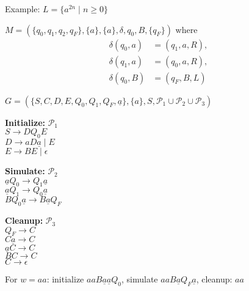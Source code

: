 \documentclass[handout]{beamer}
\begin{document}
\begin{frame}{Example: $L=\{a^{2n}\mid n\geq 0\}$}

    $M=(\{q_0,q_1,q_2,q_F\},\{a\},\{a\},\delta,q_0,B,\{q_F\})$ where 
    \begin{align*}
        \delta(q_0,a)&=( q_1,a,R),\\
        \delta(q_1,a)&=(q_0,a,R), \\
        \delta(q_0,B)&=(q_F,B,L)
    \end{align*}
        
    $G=(\{S,C,D,E,Q_0,Q_1,Q_F,\underline{a}\},\{a\},S,\mathcal P_1\cup\mathcal P_2\cup\mathcal P_3)$ \\

    \begin{multicols}{3}
        
        \textbf{Initialize:} $\mathcal P_1$\\
        $S\rightarrow DQ_0E$\\
        $D\rightarrow aD\underline{a}\mid E$\\        
        $E\rightarrow BE\mid\epsilon$

        \newcolumn

        \textbf{Simulate:} $\mathcal P_2$\\
        $\underline{a}Q_0\rightarrow Q_1\underline{a}$\\
        $\underline{a}Q_1\rightarrow Q_0\underline{a}$\\
        $BQ_0\underline{a}\rightarrow B\underline{a}Q_F$
        
        \newcolumn

        \textbf{Cleanup:} $\mathcal P_3$\\
        $Q_F\rightarrow C$\\
        $C\underline{a}\rightarrow C$\\
        $\underline{a}C\rightarrow C$\\
        $BC\rightarrow C$\\
        $C\rightarrow\epsilon$
        
    \end{multicols}
    
    \vspace{-12pt}

    For $w=aa$: initialize \alert{$aaB\underline{a}\underline{a}Q_0$},
     simulate \alert{$aaB\underline{a}Q_F\underline{a}$}, cleanup: \alert{$aa$}

\end{frame}
\end{document}
